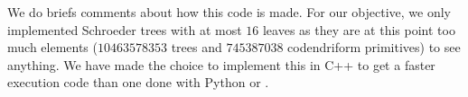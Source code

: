 \documentclass[a4paper,10pt]{amsart}
\newcommand{\Schw}{Schroeder} %
\theoremstyle{definition}
\begin{document}
We do briefs comments about how this code is made. For our objective, we only implemented \Schw{} trees with at most $16$ leaves as they are at this point too much elements ($\num{10463578353}$ trees and $\num{745387038}$ codendriform primitives)  to see anything. We have made the choice to implement this in {\ttfamily C++} to get a faster execution code than one done with {\ttfamily Python} or {\ttfamily \Sage{}}.

%
%
%
%
\end{document}
